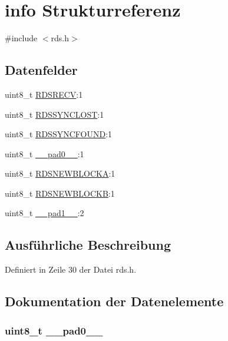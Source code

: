 \hypertarget{structinfo}{}\section{info Strukturreferenz}
\label{structinfo}


{\ttfamily \#include $<$rds.\+h$>$}

\subsection*{Datenfelder}
\begin{DoxyCompactItemize}
\item 
uint8\+\_\+t \hyperlink{structinfo_a56e25cd5c95053ebd95c3c35654680d6}{R\+D\+S\+R\+E\+C\+V}\+:1
\item 
uint8\+\_\+t \hyperlink{structinfo_a73c3d34273c45dd08fcb341496c08052}{R\+D\+S\+S\+Y\+N\+C\+L\+O\+S\+T}\+:1
\item 
uint8\+\_\+t \hyperlink{structinfo_a924e0044d60c0d490d165ceb3ef6b23d}{R\+D\+S\+S\+Y\+N\+C\+F\+O\+U\+N\+D}\+:1
\item 
uint8\+\_\+t \hyperlink{structinfo_a8b4eebe79ded0459acec2f4950102ba3}{\+\_\+\+\_\+pad0\+\_\+\+\_\+}\+:1
\item 
uint8\+\_\+t \hyperlink{structinfo_a62260ece65dc68c2467e5e1b09e5f144}{R\+D\+S\+N\+E\+W\+B\+L\+O\+C\+K\+A}\+:1
\item 
uint8\+\_\+t \hyperlink{structinfo_acd71c83a87b1a99a4784dad5f2a9477f}{R\+D\+S\+N\+E\+W\+B\+L\+O\+C\+K\+B}\+:1
\item 
uint8\+\_\+t \hyperlink{structinfo_a77f12d2e278bd5c07712648ac0df5e08}{\+\_\+\+\_\+pad1\+\_\+\+\_\+}\+:2
\end{DoxyCompactItemize}


\subsection{Ausführliche Beschreibung}


Definiert in Zeile 30 der Datei rds.\+h.



\subsection{Dokumentation der Datenelemente}
\hypertarget{structinfo_a8b4eebe79ded0459acec2f4950102ba3}{}
\subsubsection[{\+\_\+\+\_\+pad0\+\_\+\+\_\+}]{\setlength{\rightskip}{0pt plus 5cm}uint8\+\_\+t \+\_\+\+\_\+pad0\+\_\+\+\_\+}\label{structinfo_a8b4eebe79ded0459acec2f4950102ba3}


